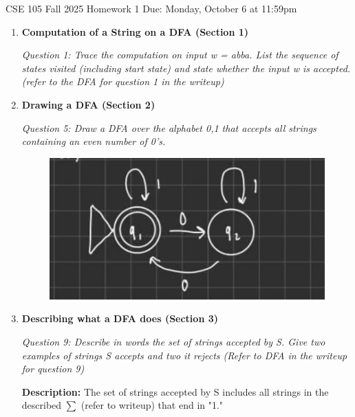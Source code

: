 \documentclass[10pt,letterpaper,unboxed,cm]{article}
\begin{document}
\hfill{CSE 105 Fall 2025}
\hfill{Homework 1}
\hfill{Due: Monday, October 6 at 11:59pm}

\begin{enumerate}
\item \textbf{Computation of a String on a DFA (Section 1)} \newline 

\emph{Question 1: Trace the computation on input w = abba. 
List the sequence of states visited (including start state) and state whether the input w is
accepted. (refer to the DFA for question 1 in the writeup)} \newline 

 \newline

\item \textbf{Drawing a DFA (Section 2)} \newline 

\emph{Question 5: Draw a DFA over the alphabet {0,1} that accepts all strings containing an even number
of 0’s.}

\begin{figure}[h!] %
    \centering %
    \includegraphics[width=0.75\linewidth]{images/cse105q5.png} %
\end{figure}

\item \textbf{Describing what a DFA does (Section 3)} \newline 

\emph{Question 9: Describe in words the set of strings accepted by S.
Give two examples of strings S accepts and two it rejects (Refer to DFA in the writeup for question 9)} \newline 

\textbf{Description:} The set of strings accepted by S includes all strings in the described $\sum$ (refer to writeup) 
that end in "1." \newline 


\end{enumerate}
\end{document}
